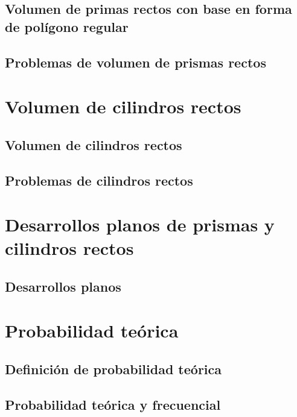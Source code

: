 \documentclass[11pt]{book}
\begin{document}
\subsection{Volumen de primas rectos con base en forma de polígono regular}
\subsection{Problemas de volumen de prismas rectos}

\newpage \thispagestyle{plain}
\section{Volumen de cilindros rectos}
\subsection{Volumen de cilindros rectos}
\subsection{Problemas de cilindros rectos}

\newpage \thispagestyle{plain}
\section{Desarrollos planos de prismas y cilindros rectos}
\subsection{Desarrollos planos}

\newpage \thispagestyle{plain}
\section{Probabilidad teórica}
\subsection{Definición de probabilidad teórica}
\subsection{Probabilidad teórica y frecuencial}
\end{document}

